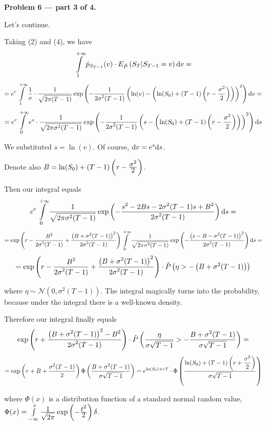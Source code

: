 \documentclass[pdftex,12pt,a4paper]{article}
\begin{document}
\textbf{Problem 6 --- part 3 of 4.}\par
Let's continue.\par
Taking (2) and (4), we have 
$$
 \int\limits_{1}^{+\infty}\tilde{p}_{S_{T-1}}(v)\cdot E_{\tilde{P}}\left(S_{T} | S_{T-1} = v\right)\mathrm{d}v =$$ $$= e^{r}\int\limits_{1}^{+\infty}\frac{\displaystyle 1}{\displaystyle \sigma}\cdot \frac{\displaystyle 1}{\displaystyle \sqrt{2\pi (T-1)}}\exp\left(-\frac{\displaystyle 1}{\displaystyle 2\sigma^{2}(T-1)}\left(\ln(v) - \left(\ln(S_{0}) + (T-1)\left(r - \frac{\displaystyle \sigma^{2}}{\displaystyle 2}\right)\right)\right)^{2}\right)\mathrm{d}v = $$ $$= e^{r}\int\limits_{0}^{+\infty}e^{s}\cdot \frac{\displaystyle 1}{\displaystyle \sqrt{2\pi\sigma^{2} (T-1)}}\exp\left(-\frac{\displaystyle 1}{\displaystyle 2\sigma^{2}(T-1)}\left(s - \left(\ln(S_{0}) + (T-1)\left(r - \frac{\displaystyle \sigma^{2}}{\displaystyle 2}\right)\right)\right)^{2}\right)\mathrm{d}s
$$\par
We substituted $s = \ln(v)$. Of course, $\mathrm{d}v = e^{s}\mathrm{d}s$.\par
Denote also $B = \ln(S_{0}) + (T-1)\left(r - \frac{\displaystyle \sigma^{2}}{\displaystyle 2}\right)$.\par
Then our integral equals
$$
e^{r}\int\limits_{0}^{+\infty} \frac{\displaystyle 1}{\displaystyle \sqrt{2\pi\sigma^{2} (T-1)}}\exp\left(-\frac{\displaystyle s^{2} - 2Bs - 2\sigma^{2}(T-1)s + B^{2}}{\displaystyle 2\sigma^{2}(T-1)}\right)\mathrm{d}s = $$ $$ = \exp\left(r - \frac{\displaystyle B^{2}}{\displaystyle 2\sigma^{2}(T-1)} + \frac{\displaystyle \left(B + \sigma^{2}(T-1)\right)^{2}}{\displaystyle 2\sigma^{2}(T-1)}\right)\int\limits_{0}^{+\infty} \frac{\displaystyle 1}{\displaystyle \sqrt{2\pi\sigma^{2} (T-1)}}\exp\left(-\frac{\displaystyle \left(s - B - \sigma^{2}(T-1)\right)^{2}}{\displaystyle 2\sigma^{2}(T-1)}\right)\mathrm{d}s = $$ $$ = \exp\left(r - \frac{\displaystyle B^{2}}{\displaystyle 2\sigma^{2}(T-1)} + \frac{\displaystyle \left(B + \sigma^{2}(T-1)\right)^{2}}{\displaystyle 2\sigma^{2}(T-1)}\right) \cdot \tilde{P}\left(\eta > -\left(B + \sigma^{2}(T-1)\right)\right)
$$\par
where $\eta \sim \mathcal{N}(0, \sigma^{2}(T-1))$. The integral magically turns into the probability, because under the integral there is a well-known density.\[\]\par
Therefore our integral finally equals
$$
 \exp\left(r + \frac{\displaystyle \left(B + \sigma^{2}(T-1)\right)^{2} - B^{2}}{\displaystyle 2\sigma^{2}(T-1)}\right)\cdot \tilde{P}\left(\frac{\displaystyle \eta}{\displaystyle \sigma\sqrt{T-1}} > -\frac{\displaystyle B + \sigma^{2}(T-1)}{\displaystyle \sigma\sqrt{T-1}}\right) = $$ $$=
\exp\left(r + B + \frac{\displaystyle \sigma^{2}(T-1)}{\displaystyle 2}\right)\Phi\left(\frac{\displaystyle B + \sigma^{2}(T-1)}{\displaystyle \sigma\sqrt{T-1}}\right) = e^{\ln(S_{0}) + rT}\cdot\Phi\left(\frac{\displaystyle \ln(S_{0}) + (T-1)\left(r + \frac{\displaystyle \sigma^{2}}{\displaystyle 2}\right)}{\displaystyle \sigma\sqrt{T-1}}\right)
$$\par
where $\Phi(x)$ is a distribution function of  a standard normal random value, $\Phi(x) = \int\limits_{-\infty}^{x}\frac{\displaystyle 1}{\displaystyle \sqrt{2\pi}}\exp\left(-\frac{\displaystyle t^{2}}{\displaystyle 2}\right)\delta$.
\end{document}
